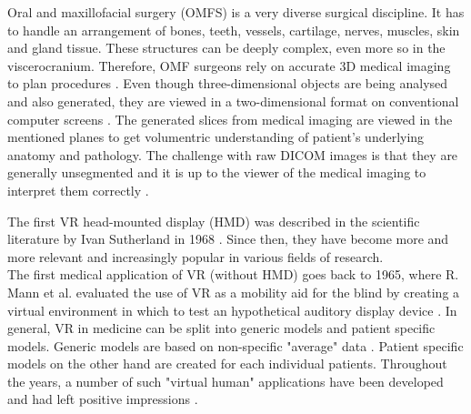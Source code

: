 Oral and maxillofacial surgery (OMFS) is a very diverse surgical discipline.
It has to handle an arrangement of bones, teeth, vessels, cartilage, nerves, muscles, skin and gland tissue.
These structures can be deeply complex, even more so in the viscerocranium.
Therefore, OMF surgeons rely on accurate 3D medical imaging to plan procedures \cite{Fonseca.2018}.
Even though three-dimensional objects are being analysed and also generated, they are viewed in a two-dimensional format on conventional computer screens \cite{brewster1984interactive}.
The generated slices from medical imaging are viewed in the mentioned planes to get volumentric understanding of patient's underlying anatomy and pathology.
The challenge with raw DICOM images is that they are generally unsegmented and it is up to the viewer of the medical imaging to interpret them correctly \cite{Handels.2009}.


The first VR head-mounted display (HMD) was described in the scientific literature by Ivan Sutherland in 1968 \cite{sutherland1968head}.
Since then, they have become more and more relevant and increasingly popular in various fields of research.
\\
The first medical application of VR (without HMD) goes back to 1965, where R. Mann et al. evaluated the use of VR as a mobility aid for the blind 
by creating a virtual environment in which to test an hypothetical auditory display device \cite{mann1965evaluation}.
In general, VR in medicine can be split into generic models and patient specific models.
Generic models are based on non-specific "average" data \cite{486713}.
Patient specific models on the other hand are created for each individual patients.
Throughout the years, a number of such "virtual human" applications have been developed and had left positive impressions \cite{486713}.

